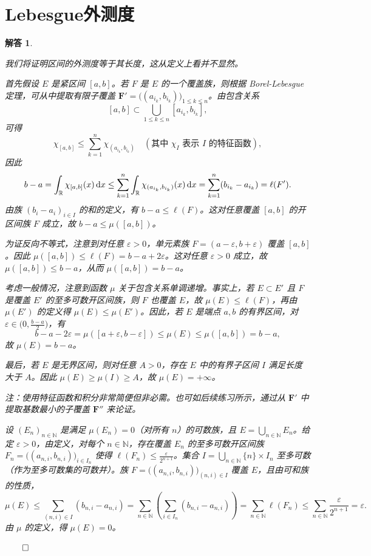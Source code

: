 \documentclass[12pt,UTF8,fontset=none]{ctexbook}
\theoremstyle{exercisestyle}
\theoremstyle{solutionstyle}
\newtheorem*{solution*}{解答}
\newenvironment{solution}
  {\begin{solution*}}
  {\hfill\ensuremath{\qed}\end{solution*}}
\begin{document}
\section{Lebesgue外测度}
\begin{solution}
\begin{subquestions}
\item 我们将证明区间的外测度等于其长度，这从定义上看并不显然。

首先假设 \(E\) 是紧区间 \([a, b]\)。若 \(F\) 是 \(E\) 的一个覆盖族，则根据 Borel-Lebesgue 定理，可从中提取有限子覆盖 \(\mathbf{F}' = \bigl((a_{i_k}, b_{i_k})\bigr)_{1 \leq k \leq n}\)。由包含关系
\[
[a, b] \subset \bigcup_{1 \leq k \leq n} [a_{i_k}, b_{i_k}],
\]
可得
\[
\chi_{[a,b]} \leq \sum_{k=1}^{n} \chi_{(a_{i_k}, b_{i_k})} \quad (\text{其中 } \chi_{I} \text{ 表示 } I \text{ 的特征函数}),
\]
因此
\[
b - a = \int_{\mathbb{R}} \chi_{[a,b]}(x) \,\mathrm{d}x \leq \sum_{k=1}^{n} \int_{\mathbb{R}} \chi_{(a_{i_k}, b_{i_k})}(x) \,\mathrm{d}x = \sum_{k=1}^{n} (b_{i_k} - a_{i_k}) = \ell(F').
\]
由族 \((b_i - a_i)_{i \in I}\) 的和的定义，有 \(b - a \leq \ell(F)\)。这对任意覆盖 \([a, b]\) 的开区间族 \(F\) 成立，故 \(b - a \leq \mu([a, b])\)。

为证反向不等式，注意到对任意 \(\varepsilon > 0\)，单元素族 \(F = (a - \varepsilon, b + \varepsilon)\) 覆盖 \([a, b]\)。因此 \(\mu([a, b]) \leq \ell(F) = b - a + 2\varepsilon\)。这对任意 \(\varepsilon > 0\) 成立，故 \(\mu([a, b]) \leq b - a\)，从而 \(\mu([a, b]) = b - a\)。

考虑一般情况，注意到函数 \(\mu\) 关于包含关系单调递增。事实上，若 \(E \subset E'\) 且 \(F\) 是覆盖 \(E'\) 的至多可数开区间族，则 \(F\) 也覆盖 \(E\)，故 \(\mu(E) \leq \ell(F)\)，再由 \(\mu(E')\) 的定义得 \(\mu(E) \leq \mu(E')\)。因此，若 \(E\) 是端点 \(a, b\) 的有界区间，对 \(\varepsilon \in \bigl(0, \frac{b-a}{2}\bigr)\)，有
\[
b - a - 2\varepsilon = \mu([a + \varepsilon, b - \varepsilon]) \leq \mu(E) \leq \mu([a, b]) = b - a,
\]
故 \(\mu(E) = b - a\)。

最后，若 \(E\) 是无界区间，则对任意 \(A > 0\)，存在 \(E\) 中的有界子区间 \(I\) 满足长度大于 \(A\)。因此 \(\mu(E) \geq \mu(I) \geq A\)，故 \(\mu(E) = +\infty\)。

注：使用特征函数和积分非常简便但非必需。也可如后续练习所示，通过从 \(\mathbf{F}'\) 中提取基数最小的子覆盖 \(\mathbf{F}''\) 来论证。

\item 设 \((E_n)_{n \in \mathbb{N}}\) 是满足 \(\mu(E_n) = 0\)（对所有 \(n\)）的可数族，且 \(E = \bigcup_{n \in \mathbb{N}} E_n\)。给定 \(\varepsilon > 0\)，由定义，对每个 \(n \in \mathbb{N}\)，存在覆盖 \(E_n\) 的至多可数开区间族 \(F_n = \bigl((a_{n,i}, b_{n,i})\bigr)_{i \in I_n}\) 使得 \(\ell(F_n) \leq \frac{\varepsilon}{2^{n+1}}\)。集合 \(I = \bigcup_{n \in \mathbb{N}} \{n\} \times I_n\) 至多可数（作为至多可数集的可数并）。族 \(F = \bigl((a_{n,i}, b_{n,i})\bigr)_{(n,i) \in I}\) 覆盖 \(E\)，且由可和族的性质，
\[
\mu(E) \leqslant \sum_{(n,i) \in I} (b_{n,i} - a_{n,i}) = \sum_{n \in \mathbb{N}} \left( \sum_{i \in I_n} (b_{n,i} - a_{n,i}) \right) = \sum_{n \in \mathbb{N}} \ell(F_n) \leqslant \sum_{n \in \mathbb{N}} \frac{\varepsilon}{2^{n+1}} = \varepsilon.
\]
由 \(\mu\) 的定义，得 \(\mu(E) = 0\)。


\end{subquestions}
\end{solution}
\end{document}
